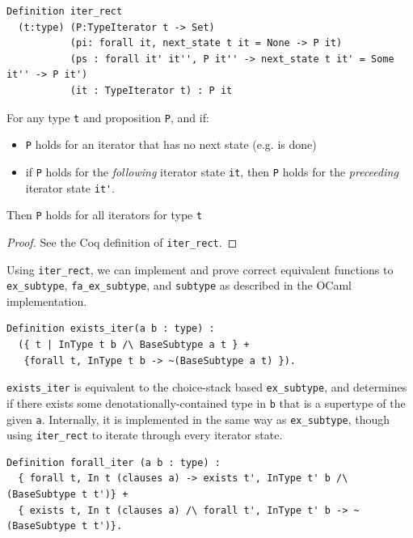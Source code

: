 \documentclass[a4paper,english]{lipics-v2018}
\begin{document}
\begin{theorem}
\begin{small}\begin{verbatim}
Definition iter_rect
  (t:type) (P:TypeIterator t -> Set)
           (pi: forall it, next_state t it = None -> P it)
           (ps : forall it' it'', P it'' -> next_state t it' = Some it'' -> P it')
           (it : TypeIterator t) : P it  
\end{verbatim}\end{small}

For any type \verb|t| and proposition \verb|P|, and if:
\begin{itemize} 
	\item \verb|P| holds for an iterator that has no next state (e.g. is done)
	\item if \verb|P| holds for the \emph{following} iterator state \verb|it|,
	then \verb|P| holds for the \emph{preceeding} iterator state \verb|it'|.
\end{itemize}
Then \verb|P| holds for all iterators for type \verb|t|
\end{theorem}
\begin{proof}
See the Coq definition of \verb|iter_rect|.
\end{proof}

Using \verb|iter_rect|, we can implement and prove correct equivalent functions
to \verb|ex_subtype|, \verb|fa_ex_subtype|, and \verb|subtype| as described in the
OCaml implementation.

\begin{small}\begin{verbatim}
Definition exists_iter(a b : type) : 
  ({ t | InType t b /\ BaseSubtype a t } +
   {forall t, InType t b -> ~(BaseSubtype a t) }).
\end{verbatim}\end{small}

\verb|exists_iter| is equivalent to the choice-stack based \verb|ex_subtype|,
and determines if there exists some denotationally-contained type in \verb|b|
that is a supertype of the given \verb|a|. Internally, it is implemented in 
the same way as \verb|ex_subtype|, though using \verb|iter_rect| to iterate 
through every iterator state.

\begin{small}\begin{verbatim}
Definition forall_iter (a b : type) :
  { forall t, In t (clauses a) -> exists t', InType t' b /\ (BaseSubtype t t')} +
  { exists t, In t (clauses a) /\ forall t', InType t' b -> ~ (BaseSubtype t t')}.
\end{verbatim}\end{small}
\end{document}
